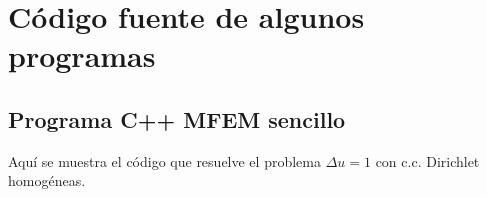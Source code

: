 \section{Código fuente de algunos programas}

\subsection{Programa C++ MFEM sencillo}
Aquí se muestra el código que resuelve el problema $\Delta u=1$ con c.c. Dirichlet homogéneas.

\label{sec:codigo-fuente-MFEM-sencillo}

